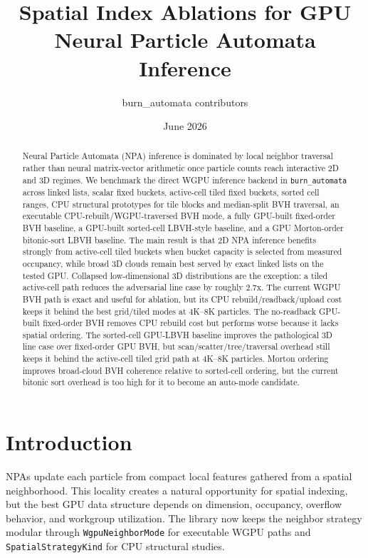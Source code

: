 \documentclass[10pt,twocolumn]{article}
\title{Spatial Index Ablations for GPU Neural Particle Automata Inference}
\author{burn\_automata contributors}
\date{June 2026}
\begin{document}
\maketitle
\begin{abstract}
Neural Particle Automata (NPA) inference is dominated by local neighbor
traversal rather than neural matrix-vector arithmetic once particle counts reach
interactive 2D and 3D regimes. We benchmark the direct WGPU inference backend in
\texttt{burn\_automata} across linked lists, scalar fixed buckets,
active-cell tiled fixed buckets, sorted cell ranges, CPU structural
prototypes for tile blocks and median-split BVH traversal, an executable
CPU-rebuilt/WGPU-traversed BVH mode, a fully GPU-built fixed-order BVH
baseline, a GPU-built sorted-cell LBVH-style baseline, and a GPU Morton-order
bitonic-sort LBVH baseline. The main result is
that 2D NPA inference benefits strongly from active-cell tiled buckets when
bucket capacity is selected from measured occupancy, while broad 3D clouds
remain best served by exact linked lists on the tested GPU. Collapsed
low-dimensional 3D distributions are the exception: a tiled active-cell path
reduces the adversarial line case by roughly 2.7x. The current WGPU BVH path is
exact and useful for ablation, but its CPU rebuild/readback/upload cost keeps it
behind the best grid/tiled modes at 4K--8K particles. The no-readback GPU-built
fixed-order BVH removes CPU rebuild cost but performs worse because it lacks
spatial ordering. The sorted-cell GPU-LBVH baseline improves the pathological
3D line case over fixed-order GPU BVH, but scan/scatter/tree/traversal overhead
still keeps it behind the active-cell tiled grid path at 4K--8K particles.
Morton ordering improves broad-cloud BVH coherence relative to sorted-cell
ordering, but the current bitonic sort overhead is too high for it to become an
auto-mode candidate.
\end{abstract}

\section{Introduction}
NPAs update each particle from compact local features gathered from a spatial
neighborhood. This locality creates a natural opportunity for spatial indexing,
but the best GPU data structure depends on dimension, occupancy, overflow
behavior, and workgroup utilization. The library now keeps the neighbor
strategy modular through \texttt{WgpuNeighborMode} for executable WGPU paths
and \texttt{SpatialStrategyKind} for CPU structural studies.
\end{document}
